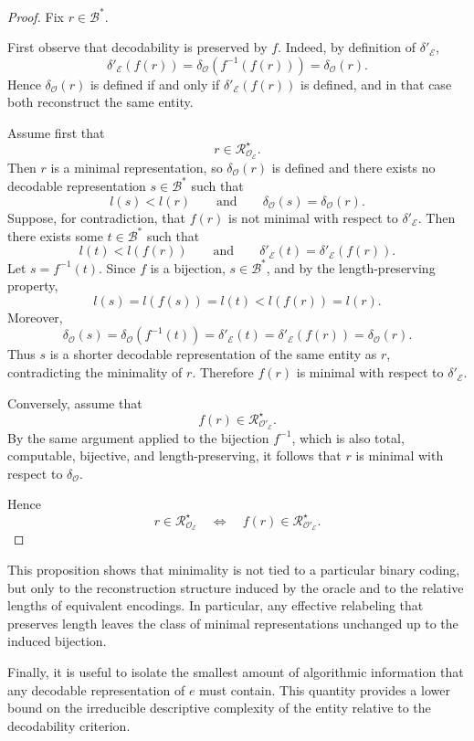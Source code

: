 \begin{proof}
Fix $r \in \mathcal{B}^\ast$.

First observe that decodability is preserved by $f$. Indeed, by definition of
$\delta'_{\mathcal{E}}$,
\[
\delta'_{\mathcal{E}}(f(r))
=
\delta_{\mathcal{O}}(f^{-1}(f(r)))
=
\delta_{\mathcal{O}}(r).
\]
Hence $\delta_{\mathcal{O}}(r)$ is defined if and only if $\delta'_{\mathcal{E}}(f(r))$ is defined, and in that case both reconstruct the same entity.

Assume first that
\[
r \in \mathcal{R}^\star_{\mathcal{O}_{\mathcal{E}}}.
\]
Then $r$ is a minimal representation, so $\delta_{\mathcal{O}}(r)$ is defined and there exists no decodable representation $s \in \mathcal{B}^\ast$ such
that
\[
l(s) < l(r)
\qquad\text{and}\qquad
\delta_{\mathcal{O}}(s)=\delta_{\mathcal{O}}(r).
\]
Suppose, for contradiction, that $f(r)$ is not minimal with respect to $\delta'_{\mathcal{E}}$. Then there exists some $t \in \mathcal{B}^\ast$ such that
\[
l(t) < l(f(r))
\qquad\text{and}\qquad
\delta'_{\mathcal{E}}(t)=\delta'_{\mathcal{E}}(f(r)).
\]
Let $s=f^{-1}(t)$. Since $f$ is a bijection, $s \in \mathcal{B}^\ast$, and by the length-preserving property,
\[
l(s)=l(f(s))=l(t)<l(f(r))=l(r).
\]
Moreover,
\[
\delta_{\mathcal{O}}(s)
=
\delta_{\mathcal{O}}(f^{-1}(t))
=
\delta'_{\mathcal{E}}(t)
=
\delta'_{\mathcal{E}}(f(r))
=
\delta_{\mathcal{O}}(r).
\]
Thus $s$ is a shorter decodable representation of the same entity as $r$, contradicting the minimality of $r$. Therefore $f(r)$ is minimal with respect to $\delta'_{\mathcal{E}}$.

Conversely, assume that
\[
f(r) \in \mathcal{R}^\star_{\mathcal{O}'_{\mathcal{E}}}.
\]
By the same argument applied to the bijection $f^{-1}$, which is also total, computable, bijective, and length-preserving, it follows that $r$ is minimal with respect to $\delta_{\mathcal{O}}$.

Hence
\[
r \in \mathcal{R}^\star_{\mathcal{O}_{\mathcal{E}}}
\quad\Longleftrightarrow\quad
f(r) \in \mathcal{R}^\star_{\mathcal{O}'_{\mathcal{E}}}.
\]
\end{proof}

This proposition shows that minimality is not tied to a particular binary coding, but only to the reconstruction structure induced by the oracle and to the relative lengths of equivalent encodings. In particular, any effective relabeling that preserves length leaves the class of minimal representations unchanged up to the induced bijection.

Finally, it is useful to isolate the smallest amount of algorithmic information that any decodable representation of $e$ must contain. This quantity provides a lower bound on the irreducible descriptive complexity of the entity relative to the decodability criterion.


